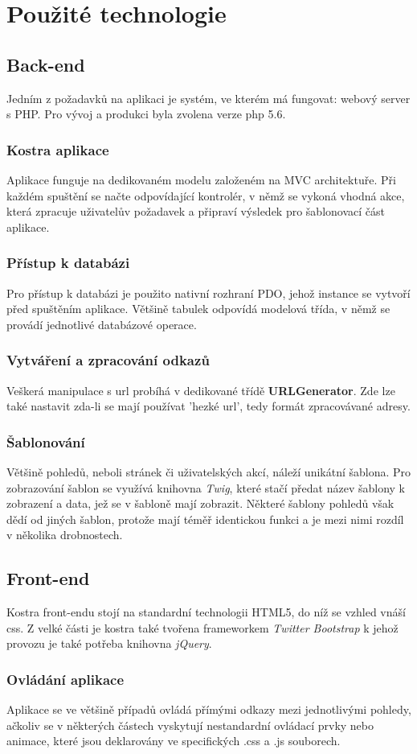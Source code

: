 \documentclass[12pt,a4paper]{article}
\let\oldsection\section
\renewcommand\section{\clearpage\oldsection}
\begin{document}
{\section{Použité technologie}}
{\subsection{Back-end}}
Jedním z požadavků na aplikaci je systém, ve kterém má fungovat: webový server s PHP. Pro vývoj a produkci byla zvolena verze php 5.6.
{\subsubsection{Kostra aplikace}}
Aplikace funguje na dedikovaném modelu založeném na MVC architektuře. Při každém spuštění se načte odpovídající kontrolér, v němž se vykoná vhodná akce, která zpracuje uživatelův požadavek a připraví výsledek pro šablonovací část aplikace.
{\subsubsection{Přístup k databázi}}
Pro přístup k databázi je použito nativní rozhraní PDO, jehož instance se vytvoří před spuštěním aplikace. Většině tabulek odpovídá modelová třída, v němž se provádí jednotlivé databázové operace.
{\subsubsection{Vytváření a zpracování odkazů}}
Veškerá manipulace s url probíhá v dedikované třídě \textbf{URLGenerator}. Zde lze také nastavit zda-li se mají používat 'hezké url', tedy formát zpracovávané adresy.
{\subsubsection{Šablonování}}
Většině pohledů, neboli stránek či uživatelských akcí, náleží unikátní šablona. Pro zobrazování šablon se využívá knihovna \textit{Twig}, které stačí předat název šablony k zobrazení a data, jež se v šabloně mají zobrazit. Některé šablony pohledů však dědí od jiných šablon, protože mají téměř identickou funkci a je mezi nimi rozdíl v několika drobnostech.
{\subsection{Front-end}}
Kostra front-endu stojí na standardní technologii HTML5, do níž se vzhled vnáší css. Z velké části je kostra také tvořena frameworkem \textit{Twitter Bootstrap} k jehož provozu je také potřeba knihovna \textit{jQuery}.
{\subsubsection{Ovládání aplikace}}
Aplikace se ve většině případů ovládá přímými odkazy mezi jednotlivými pohledy, ačkoliv se v některých částech vyskytují nestandardní ovládací prvky nebo animace, které jsou deklarovány ve specifických .css a .js souborech.
\end{document}
